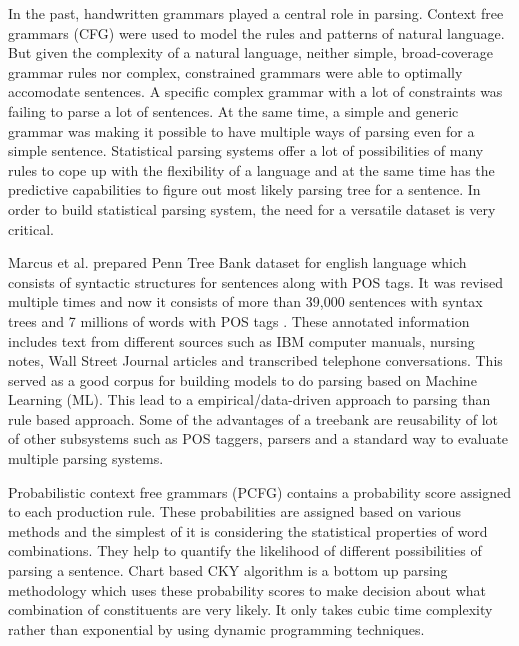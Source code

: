 \documentclass[a4paper, 11pt]{article}
\begin{document}
In the past, handwritten grammars played a central role in parsing. Context free grammars (CFG) were used to model the rules and patterns of natural language. But given the complexity of a natural language, neither simple, broad-coverage grammar rules nor complex, constrained grammars were able to optimally accomodate sentences. A specific complex grammar with a lot of constraints was failing to parse a lot of sentences. At the same time, a simple and generic grammar was making it possible to have multiple ways of parsing even for a simple sentence. Statistical parsing systems offer a lot of possibilities of many rules to cope up with the flexibility of a language and at the same time has the predictive capabilities to figure out most likely parsing tree for a sentence. In order to build statistical parsing system, the need for a versatile dataset is very critical.


Marcus et al.\parencite{Marcus1993} prepared Penn Tree Bank dataset for english language which consists of syntactic structures for sentences along with POS tags. It was revised multiple times and now it consists of more than 39,000 sentences with syntax trees and 7 millions of words with POS tags \parencite{Taylor2003}. These annotated information includes text from different sources such as IBM computer manuals, nursing notes, Wall Street Journal articles and transcribed telephone conversations. This served as a good corpus for building models to do parsing based on Machine Learning (ML). This lead to a empirical/data-driven approach to parsing than rule based approach. Some of the advantages of a treebank are reusability of lot of other subsystems such as POS taggers, parsers  and a standard way to evaluate multiple parsing systems. 


Probabilistic context free grammars (PCFG) contains a probability score assigned to each production rule. These probabilities are assigned based on various methods and the simplest of it is considering the statistical properties of word combinations. They help to quantify the likelihood of different possibilities of parsing a sentence. Chart based CKY algorithm is a bottom up parsing methodology which uses these probability scores to make decision about what combination of constituents are very likely. It only takes cubic time complexity rather than exponential by using dynamic programming techniques. 
\end{document}
